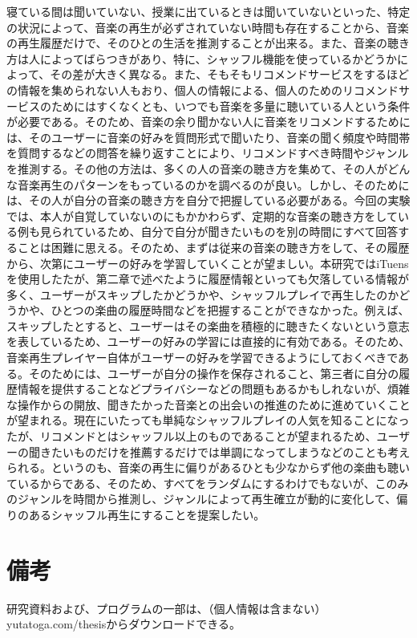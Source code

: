 \documentclass{jsarticle}
\begin{document}
寝ている間は聞いていない、授業に出ているときは聞いていないといった、特定の状況によって、音楽の再生が必ずされていない時間も存在することから、音楽の再生履歴だけで、そのひとの生活を推測することが出来る。また、音楽の聴き方は人によってばらつきがあり、特に、シャッフル機能を使っているかどうかによって、その差が大きく異なる。また、そもそもリコメンドサービスをするほどの情報を集められない人もおり、個人の情報による、個人のためのリコメンドサービスのためにはすくなくとも、いつでも音楽を多量に聴いている人という条件が必要である。そのため、音楽の余り聞かない人に音楽をリコメンドするためには、そのユーザーに音楽の好みを質問形式で聞いたり、音楽の聞く頻度や時間帯を質問するなどの問答を繰り返すことにより、リコメンドすべき時間やジャンルを推測する。その他の方法は、多くの人の音楽の聴き方を集めて、その人がどんな音楽再生のパターンをもっているのかを調べるのが良い。しかし、そのためには、その人が自分の音楽の聴き方を自分で把握している必要がある。今回の実験では、本人が自覚していないのにもかかわらず、定期的な音楽の聴き方をしている例も見られているため、自分で自分が聞きたいものを別の時間にすべて回答することは困難に思える。そのため、まずは従来の音楽の聴き方をして、その履歴から、次第にユーザーの好みを学習していくことが望ましい。本研究ではiTuensを使用したたが、第二章で述べたように履歴情報といっても欠落している情報が多く、ユーザーがスキップしたかどうかや、シャッフルプレイで再生したのかどうかや、ひとつの楽曲の履歴時間などを把握することができなかった。例えば、スキップしたとすると、ユーザーはその楽曲を積極的に聴きたくないという意志を表しているため、ユーザーの好みの学習には直接的に有効である。そのため、音楽再生プレイヤー自体がユーザーの好みを学習できるようにしておくべきである。そのためには、ユーザーが自分の操作を保存されること、第三者に自分の履歴情報を提供することなどプライバシーなどの問題もあるかもしれないが、煩雑な操作からの開放、聞きたかった音楽との出会いの推進のために進めていくことが望まれる。現在にいたっても単純なシャッフルプレイの人気を知ることになったが、リコメンドとはシャッフル以上のものであることが望まれるため、ユーザーの聞きたいものだけを推薦するだけでは単調になってしまうなどのことも考えられる。というのも、音楽の再生に偏りがあるひとも少なからず他の楽曲も聴いているからである、そのため、すべてをランダムにするわけでもないが、このみのジャンルを時間から推測し、ジャンルによって再生確立が動的に変化して、偏りのあるシャッフル再生にすることを提案したい。

\section{備考}
研究資料および、プログラムの一部は、（個人情報は含まない）
yutatoga.com/thesisからダウンロードできる。
\end{document}
